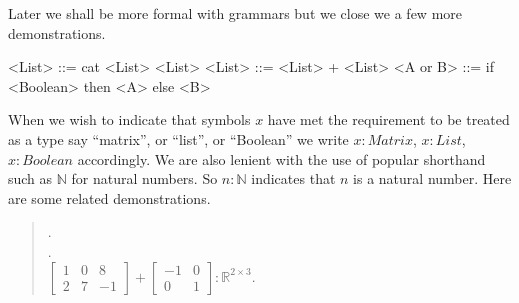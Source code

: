 Later we shall be more formal with grammars but we close we a few more 
demonstrations.
\begin{center}
\begin{Gcode}
<List> ::= cat <List> <List>
<List> ::= <List> + <List>
<A or B> ::= if <Boolean> then <A> else <B>
\end{Gcode}
\end{center}
When we wish to indicate that symbols $x$ have met the requirement to be 
treated as a type say ``matrix'', or ``list'', or ``Boolean'' we 
write $x:Matrix$, $x:List$, $x:Boolean$ accordingly.  We are also 
lenient with the use of popular shorthand such as $\mathbb{N}$ for natural 
numbers.  So $n:\mathbb{N}$ indicates that $n$ is a natural number.
Here are some related demonstrations.
\begin{quote}
    .\\
    .\\
    $\displaystyle 
        \begin{bmatrix} 1 & 0 & 8 \\ 2 & 7 & -1\end{bmatrix}
    + \begin{bmatrix} -1 & 0 \\ 0 & 1 \end{bmatrix}:\mathbb{R}^{2\times 3}$.
\end{quote}
